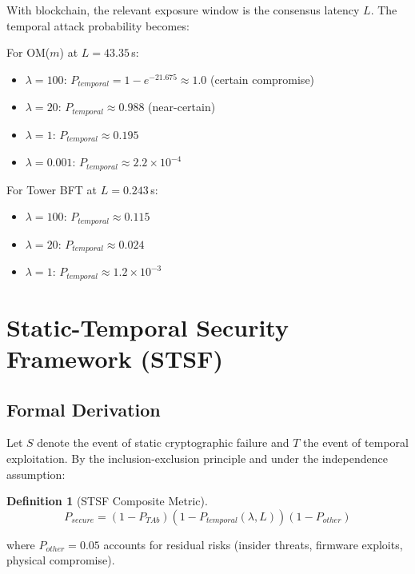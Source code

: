 \documentclass[10pt,twocolumn,letterpaper]{article}
\newtheorem{definition}{Definition}
\begin{document}
With blockchain, the relevant exposure window is the consensus latency $L$. The temporal attack probability becomes:

For OM($m$) at $L = 43.35$\,s:
\begin{itemize}[leftmargin=*]
    \item $\lambda = 100$: $P_{temporal} = 1 - e^{-21.675} \approx 1.0$ (certain compromise)
    \item $\lambda = 20$: $P_{temporal} \approx 0.988$ (near-certain)
    \item $\lambda = 1$: $P_{temporal} \approx 0.195$
    \item $\lambda = 0.001$: $P_{temporal} \approx 2.2 \times 10^{-4}$
\end{itemize}

For Tower BFT at $L = 0.243$\,s:
\begin{itemize}[leftmargin=*]
    \item $\lambda = 100$: $P_{temporal} \approx 0.115$
    \item $\lambda = 20$: $P_{temporal} \approx 0.024$
    \item $\lambda = 1$: $P_{temporal} \approx 1.2 \times 10^{-3}$
\end{itemize}

\section{Static-Temporal Security Framework (STSF)}
\label{sec:stsf}

\subsection{Formal Derivation}

Let $S$ denote the event of static cryptographic failure and $T$ the event of temporal exploitation. By the inclusion-exclusion principle and under the independence assumption:

\begin{definition}[STSF Composite Metric]
\begin{equation}
\boxed{P_{secure} = (1 - P_{TAb})(1 - P_{temporal}(\lambda, L))(1 - P_{other})}
\label{eq:stsf}
\end{equation}
\end{definition}

where $P_{other} = 0.05$ accounts for residual risks (insider threats, firmware exploits, physical compromise).
\end{document}
